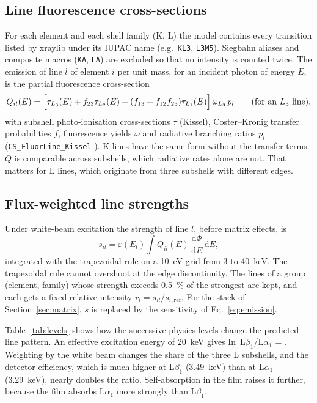 \documentclass[11pt,a4paper]{article}
\newcommand{\dd}{\mathrm{d}}
\newcommand{\code}[1]{\texttt{#1}}
\begin{document}
\subsection{Line fluorescence cross-sections}
For each element and each shell family (K, L) the model contains every transition listed by xraylib
under its IUPAC name (e.g.\ \code{KL3}, \code{L3M5}). Siegbahn aliases and composite macros
(\code{KA}, \code{LA}) are excluded so that no intensity is counted twice. The emission of line $l$
of element $i$ per unit mass, for an incident photon of energy $E$, is the partial fluorescence
cross-section
\begin{equation}
Q_{il}(E) = \Bigl[\tau_{L_3}(E) + f_{23}\tau_{L_2}(E) + (f_{13}+f_{12}f_{23})\tau_{L_1}(E)\Bigr]\,
\omega_{L_3}\,p_{l}\qquad(\text{for an }L_3\text{ line}),
\label{eq:Q}
\end{equation}
with subshell photo-ionisation cross-sections $\tau$ (Kissel), Coster--Kronig transfer probabilities $f$,
fluorescence yields $\omega$ and radiative branching ratios $p_l$
(\code{CS\_FluorLine\_Kissel} \citep{Brunetti2004,Schoonjans2011,Krause1979,Campbell2003,Elam2002}).
K lines have the same form without the transfer terms. $Q$ is comparable across subshells, which
radiative rates alone are not. That matters for L lines, which originate from three subshells with
different edges.

\subsection{Flux-weighted line strengths}
Under white-beam excitation the strength of line $l$, before matrix effects, is
\begin{equation}
s_{il} = \varepsilon(E_l)\int Q_{il}(E)\,\frac{\dd\Phi}{\dd E}\,\dd E ,
\label{eq:strength}
\end{equation}
integrated with the trapezoidal rule on a \qty{10}{eV} grid from \num{3} to \qty{40}{keV}. The trapezoidal
rule cannot overshoot at the edge discontinuity. The lines of a group (element, family) whose strength
exceeds \qty{0.5}{\percent} of the strongest are kept, and each gets a fixed relative intensity
$r_l = s_{il}/s_{i,\mathrm{ref}}$. For the stack of Section~\ref{sec:matrix}, $s$ is replaced by the
sensitivity of Eq.~\eqref{eq:emission}.

Table~\ref{tab:levels} shows how the successive physics levels change the predicted line pattern. An
effective excitation energy of \qty{20}{keV} gives In~L$\beta_1$/L$\alpha_1$ = \rInLbScalar. Weighting
by the white beam changes the share of the three L subshells, and the detector efficiency, which is
much higher at L$\beta_1$ (\qty{3.49}{keV}) than at L$\alpha_1$ (\qty{3.29}{keV}), nearly doubles the
ratio. Self-absorption in the film raises it further, because the film absorbs L$\alpha_1$ more strongly
than L$\beta_1$.
\end{document}
